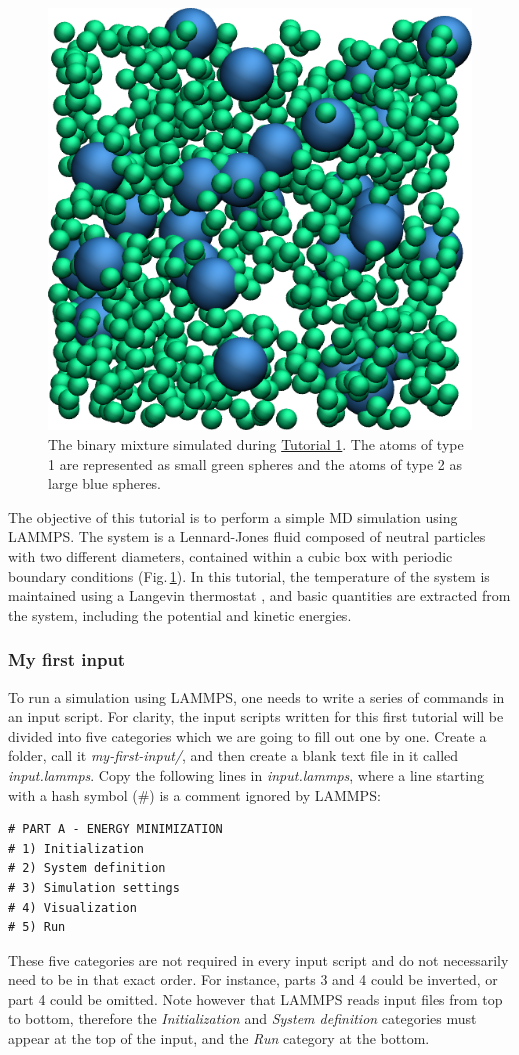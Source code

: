 \documentclass[9pt,tutorial]{livecoms}
\begin{document}
\begin{figure}
\centering
\includegraphics[width=0.55\linewidth]{LJ}
\caption{The binary mixture simulated during \hyperref[lennard-jones-label]{Tutorial 1}. The atoms of type 1 are represented as small green spheres and the atoms of type 2 as large blue spheres.}
\label{fig:LJ}
\end{figure}

\noindent The objective of this tutorial is to perform a simple MD simulation using LAMMPS. The system is a Lennard-Jones fluid composed of neutral particles with two different diameters, contained within a cubic box with periodic boundary conditions (Fig.\,\ref{fig:LJ}). In this tutorial, the temperature of the system is maintained using a Langevin thermostat \cite{schneider1978molecular}, and basic quantities are extracted from the system, including the potential and kinetic energies. 

\subsubsection{My first input}

\noindent To run a simulation using LAMMPS, one needs to write a series of commands in an input script. For clarity, the input scripts written for this first tutorial will be divided into five categories which we are going to fill out one by one. Create a folder, call it \textit{my-first-input/}, and then create a blank text file in it called \textit{input.lammps}. Copy the following lines in \textit{input.lammps}, where a line starting with a hash symbol ($\#$) is a comment ignored by LAMMPS:
{\normalsize \begin{verbatim}
# PART A - ENERGY MINIMIZATION
# 1) Initialization
# 2) System definition
# 3) Simulation settings
# 4) Visualization
# 5) Run
\end{verbatim}}
\noindent These five categories are not required in every input script and do not necessarily need to be in that exact order. For instance, parts 3 and 4 could be inverted, or part 4 could be omitted. Note however that LAMMPS reads input files from top to bottom, therefore the \textit{Initialization} and \textit{System definition} categories must appear at the top of the input, and the \textit{Run} category at the bottom.
\end{document}
